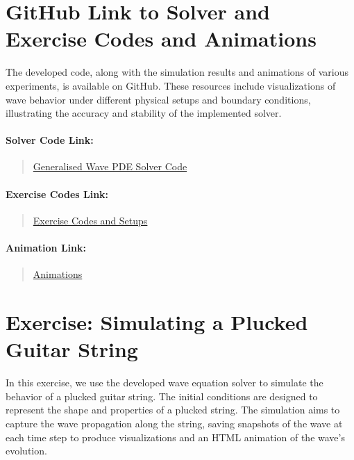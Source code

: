 \documentclass{article}
\begin{document}
	\section{GitHub Link to Solver and Exercise Codes and Animations}
	
	The developed code, along with the simulation results and animations of various experiments, is available on GitHub. These resources include visualizations of wave behavior under different physical setups and boundary conditions, illustrating the accuracy and stability of the implemented solver.
	
	\paragraph{Solver Code Link:}
	\begin{quote}
		\href{https://github.com/pb96git/Numerical-Solutions-for-Partial-Differential-Equations/blob/main/Part_2_WaveEquation/SolverCode/wave_eq_solver_dev.py}{Generalised Wave PDE Solver Code}
	\end{quote}
	
	\paragraph{Exercise Codes Link:}
	\begin{quote}
		\href{https://github.com/pb96git/Numerical-Solutions-for-Partial-Differential-Equations/tree/main/Part_2_WaveEquation/Example_Codes}{Exercise Codes and Setups}
	\end{quote}
	
	\paragraph{Animation Link:}
	\begin{quote}
		\href{https://github.com/pb96git/Numerical-Solutions-for-Partial-Differential-Equations/tree/main/Part_2_WaveEquation/Animations_postProcessing}{Animations}
	\end{quote}
	
		
		
		\newpage	
	\section{Exercise: Simulating a Plucked Guitar String}
	
		In this exercise, we use the developed wave equation solver to simulate the behavior of a plucked guitar string. The initial conditions are designed to represent the shape and properties of a plucked string. The simulation aims to capture the wave propagation along the string, saving snapshots of the wave at each time step to produce visualizations and an HTML animation of the wave's evolution.
	
\end{document}
